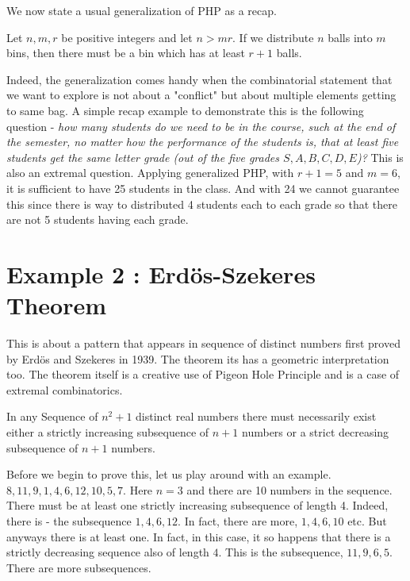 We now state a usual generalization of PHP as a recap.

\begin{theorem}
Let $n,m ,r$ be positive integers and let $n > mr$. If we distribute $n$ balls into $m$ bins, then there must be a bin which has at least $r+1$ balls.
\end{theorem}

Indeed, the generalization comes handy when the combinatorial statement that we want to explore is not about a "conflict" but about multiple elements getting to same bag. A simple recap example to demonstrate this is the following question - {\em how many students do we need to be in the course, such at the end of the semester, no matter how the performance of the students is, that at least five students get the same letter grade (out of the five grades $S,A,B,C,D,E$)?} This is also an extremal question. Applying generalized PHP, with $r+1 = 5$ and $m=6$, it is sufficient to have 25 students in the class.  And with 24 we cannot guarantee this since there is way to distributed 4 students each to each grade so that there are not 5 students having each grade.

\section{Example 2 : Erd\"os-Szekeres Theorem}

This is about a pattern that appears in sequence of distinct numbers first proved by Erd\"os and Szekeres in 1939. The theorem its has a geometric interpretation too. The theorem itself is a creative use of Pigeon Hole Principle and is a case of extremal combinatorics.

\begin{theorem}
In any Sequence of $n^2+1$ distinct real numbers there must necessarily exist either a strictly increasing subsequence  of $n+1$ numbers  or a strict decreasing subsequence of $n+1$ numbers.
\end{theorem}
Before we begin to prove this, let us play around with an example.
$8, 11, 9, 1, 4, 6, 12, 10, 5, 7$. Here $n=3$ and there are 10 numbers in the sequence. There must be at least one strictly increasing subsequence of length 4. Indeed, there is - the subsequence $1,4,6,12$. In fact, there are more, $1,4,6,10$ etc. But anyways there is at least one. In fact, in this case, it so happens that there is a strictly decreasing sequence also of length $4$. This is the subsequence, $11, 9, 6, 5$. There are more subsequences.

